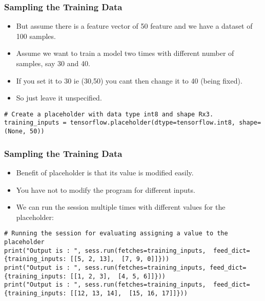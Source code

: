 \begin{frame}[fragile] \frametitle{Sampling the Training Data}

\begin{itemize}
\item But assume there is a feature vector of 50 feature and we have a dataset of 100 samples. 
\item Assume we want to train a model two times with different number of samples, say 30 and 40.
\item If you set it to 30 ie (30,50) you cant then change it to 40 (being fixed). 
\item So just leave it unspecified.
\end{itemize}
\begin{lstlisting}
# Create a placeholder with data type int8 and shape Rx3.  
training_inputs = tensorflow.placeholder(dtype=tensorflow.int8, shape=(None, 50))
\end{lstlisting}
\end{frame}


\begin{frame}[fragile] \frametitle{Sampling the Training Data}

\begin{itemize}
\item Benefit of placeholder is that its value is modified easily. 
\item You have not to modify the program for different inputs. 
\item We can run the session multiple times with different values for the placeholder:
\end{itemize}
\begin{lstlisting}
# Running the session for evaluating assigning a value to the placeholder  
print("Output is : ", sess.run(fetches=training_inputs,  feed_dict={training_inputs: [[5, 2, 13],  [7, 9, 0]]}))  
print("Output is : ", sess.run(fetches=training_inputs, feed_dict={training_inputs: [[1, 2, 3],  [4, 5, 6]]}))  
print("Output is : ", sess.run(fetches=training_inputs,  feed_dict={training_inputs: [[12, 13, 14],  [15, 16, 17]]}))
\end{lstlisting}
\end{frame}

